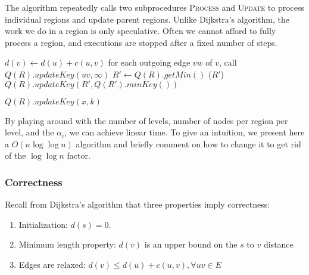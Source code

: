 \documentclass[12pt]{article}
\begin{document}
The algorithm repeatedly calls two subprocedures \textsc{Process} and \textsc{Update} to process individual regions and update parent regions. Unlike Dijkstra's algorithm, the work we do in a region is only speculative. Often we cannot afford to fully process a region, and executions are stopped after a fixed number of steps.

\begin{algorithm}[!h]
  \label{alg:process}
  \begin{algorithmic}[1]
          \State $d(v) \gets d(u) + c(u,v)$
          \State for each outgoing edge $vw$ of $v$, call 
        \EndIf
        \State $Q(R).updateKey(uv,\infty)$
      \Else
        \Repeat
          \State $R' \gets Q(R).getMin()$
          \State {}($R'$)
          \State $Q(R).updateKey(R',Q(R').minKey())$
      \EndIf
    \EndProcedure
  \end{algorithmic}
\end{algorithm}


\begin{algorithm}[!h]
  \label{alg:update}
  \begin{algorithmic}[1]
      \State $Q(R).updateKey(x,k)$
        \State {}
      \EndIf
    \EndProcedure
  \end{algorithmic}
\end{algorithm}

By playing around with the number of levels, number of nodes per region per level, and the $\alpha_i$, we can achieve linear time. To give an intuition, we present here a $O(n \log \log n)$ algorithm and briefly comment on how to change it to get rid of the $\log \log n$ factor.

\subsubsection{Correctness}
\label{sec:correctness}

Recall from Dijkstra's algorithm that three properties imply correctness:
\begin{enumerate}
\item Initialization: $d(s) = 0$.
\item Minimum length property: $d(v)$ is an upper bound on the $s$ to $v$ distance
\item Edges are relaxed: $d(v) \leq d(u) + c(u,v), \forall uv \in E$
\end{enumerate}
\end{document}
